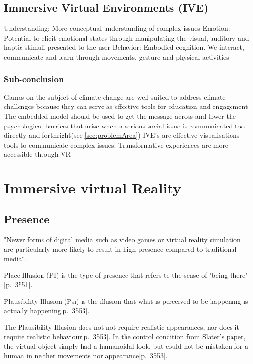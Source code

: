     \subsection{Immersive Virtual Environments (IVE)}
    Understanding: More conceptual understanding of complex issues\cite{vrEngagementClimateChange}
    Emotion: Potential to elicit emotional states through manipulating the visual, auditory and haptic stimuli presented to the user
    Behavior: Embodied cognition. We interact, communicate and learn through movements, gesture and physical activities

    \subsubsection{Sub-conclusion}
    Games on the subject of climate change are well-suited to address climate challenges because they can serve as effective tools for education and engagement\cite{gamesAsToolsForEngagement}
    The embedded model should be used to get the message across and lower the psychological barriers that arise when a serious social issue is communicated too directly and forthright(see \autoref{sec:problemArea})
    IVE's are effective visualisations tools to communicate complex issues.
    Transformative experiences are more accessible through VR


\section{Immersive virtual Reality}
    \subsection{Presence}
    "Newer forms of digital media such as video games or virtual reality simulation are particularly more likely to result in high presence compared to traditional media"\cite{ahn2011embodied}.
    
    Place Illusion (PI) is the type of presence that refers to the sense of "being there"\citep{vrImmersion}[p.~3551].
    
    Plausibility Illusion (Psi) is the illusion that what is perceived to be happening is actually happening\citep{vrImmersion}[p.~3553].
    
    The Plausibility Illusion does not not require realistic appearances, nor does it require realistic behaviour\citep{vrImmersion}[p.~3553]. In the control condition from Slater's paper, the virtual object simply had a humanoidal look, but could not be mistaken for a human in neither movements nor appearance\citep{vrImmersion}[p.~3553].
    
